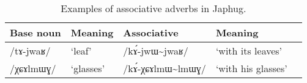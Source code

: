 \documentclass[12pt]{article}
\newcommand{\ipa}[1]{\mbox{\phon/#1/}}
\newcommand{\tld}{\textasciitilde{}}
\begin{document}
\begin{table}
 \caption{Examples of associative adverbs in Japhug.} \label{tab:assoc.adv} 
\begin{tabular}{lllll}
\toprule
Base noun & Meaning & Associative & Meaning \\
\midrule
\ipa{tɤ-jwaʁ} & `leaf' & \ipa{kɤ́-jwɯ\tld{}jwaʁ} & `with its leaves' \\
\ipa{χɕɤlmɯɣ} & `glasses' & \ipa{kɤ́-χɕɤlmɯ\tld{}lmɯɣ} & `with his glasses' \\
\bottomrule
\end{tabular}
\end{table}
    
     
\end{document}
